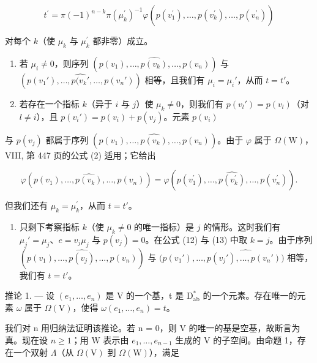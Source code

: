 \[
t ^ {\prime} = \pi (- 1) ^ {n - k} \pi (\mu_ {k} ^ {\prime}) ^ {- 1} \varphi (p (v _ {1} ^ {\prime}), \ldots , \widehat {p (v _ {k} ^ {\prime})}, \ldots , p (v _ {n} ^ {\prime}))
\]

对每个 \(k\)（使 \(\mu_{k}\) 与 \(\mu_k^\prime\) 都非零）成立。

\begin{enumerate}
\def\labelenumi{\alph{enumi})}
\item
  若 \(\mu_i \neq 0\)，则序列 \((p(v_1), \ldots, \widehat{p(v_k)}, \ldots, p(v_n))\) 与 \((p(v_1'), \ldots, \widehat{p(v_k'}, \ldots, p(v_n'))\) 相等，且我们有 \(\mu_i = \mu_i'\)，从而 \(t = t'\)。
\item
  若存在一个指标 \(k\)（异于 \(i\) 与 \(j\)）使 \(\mu_k \neq 0\)，则我们有 \(p(v_l') = p(v_l)\)（对 \(l \neq i\)），且 \(p(v_i') = p(v_i) + p(v_j)\)。元素 \(p(v_i)\)
\end{enumerate}

与 \(p(v_{j})\) 都属于序列 \((p(v_{1}),\ldots ,\widehat{p(v_{k})},\ldots ,p(v_{n}))\)。由于 \(\varphi\) 属于 \(\Omega (\mathrm{W})\)，VIII, 第 447 页的公式 (2) 适用；它给出

\[
\varphi (p (v _ {1}), \dots , \widehat {p (v _ {k})}, \dots , p (v _ {n})) = \varphi (p (v _ {1} ^ {\prime}), \dots , \widehat {p (v _ {k} ^ {\prime})}, \dots , p (v _ {n} ^ {\prime})).
\]

但我们还有 \(\mu_{k} = \mu_{k}^{\prime}\)，从而 \(t = t'\)。

\begin{enumerate}
\def\labelenumi{\alph{enumi})}
\setcounter{enumi}{2}
\tightlist
\item
  只剩下考察指标 \(k\)（使 \(\mu_k \neq 0\) 的唯一指标）是 \(j\) 的情形。这时我们有 \(\mu_j' = \mu_j\)、\(e = v_j\mu_j\) 与 \(p(v_j) = 0\)。在公式 (12) 与 (13) 中取 \(k = j\)。由于序列 \((p(v_1), \ldots, \widehat{p(v_j)}, \ldots, p(v_n))\) 与 \((p(v_1'), \ldots, \widehat{p(v_j'), \ldots, p(v_n'))}\) 相等，我们有 \(t = t'\)。
\end{enumerate}

推论 1. --- 设 \((e_1, \ldots, e_n)\) 是 V 的一个基，t 是 \(\mathrm{D}_{\mathrm{ab}}^*\) 的一个元素。存在唯一的元素 \(\omega\) 属于 \(\Omega(\mathrm{V})\)，使得 \(\omega(e_1, \ldots, e_n) = t\)。

我们对 n 用归纳法证明该推论。若 n = 0，则 V 的唯一的基是空基，故断言为真。现在设 \(n \geqslant 1\)；用 W 表示由 \(e_{1}, \ldots, e_{n-1}\) 生成的 V 的子空间。由命题 1，存在一个双射 \(\Lambda\)（从 \(\Omega(\mathrm{V})\) 到 \(\Omega(\mathrm{W})\)），满足

